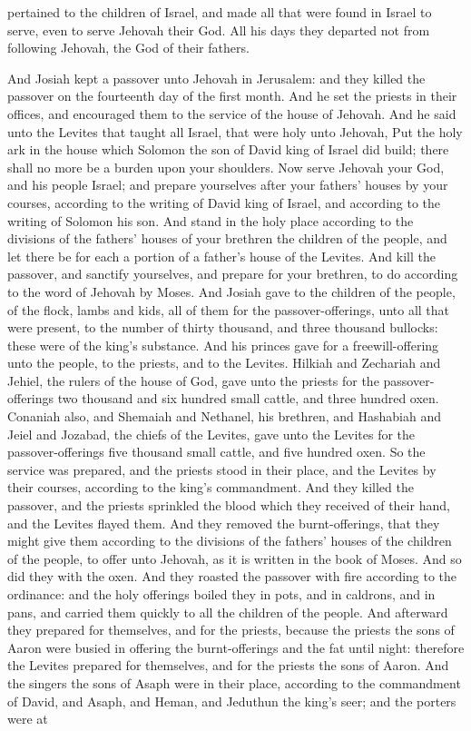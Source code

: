 pertained to the children of Israel, and made all that were found in Israel to serve, even to serve Jehovah their God. All his days they departed not from following Jehovah, the God of their fathers. 

And Josiah kept a passover unto Jehovah in Jerusalem: and they killed the passover on the fourteenth day of the first month. And he set the priests in their offices, and encouraged them to the service of the house of Jehovah. And he said unto the Levites that taught all Israel, that were holy unto Jehovah, Put the holy ark in the house which Solomon the son of David king of Israel did build; there shall no more be a burden upon your shoulders. Now serve Jehovah your God, and his people Israel; and prepare yourselves after your fathers’ houses by your courses, according to the writing of David king of Israel, and according to the writing of Solomon his son. And stand in the holy place according to the divisions of the fathers’ houses of your brethren the children of the people, and let there be for each a portion of a father’s house of the Levites. And kill the passover, and sanctify yourselves, and prepare for your brethren, to do according to the word of Jehovah by Moses.  And Josiah gave to the children of the people, of the flock, lambs and kids, all of them for the passover-offerings, unto all that were present, to the number of thirty thousand, and three thousand bullocks: these were of the king’s substance. And his princes gave for a freewill-offering unto the people, to the priests, and to the Levites. Hilkiah and Zechariah and Jehiel, the rulers of the house of God, gave unto the priests for the passover-offerings two thousand and six hundred small cattle, and three hundred oxen. Conaniah also, and Shemaiah and Nethanel, his brethren, and Hashabiah and Jeiel and Jozabad, the chiefs of the Levites, gave unto the Levites for the passover-offerings five thousand small cattle, and five hundred oxen.  So the service was prepared, and the priests stood in their place, and the Levites by their courses, according to the king’s commandment. And they killed the passover, and the priests sprinkled the blood which they received of their hand, and the Levites flayed them. And they removed the burnt-offerings, that they might give them according to the divisions of the fathers’ houses of the children of the people, to offer unto Jehovah, as it is written in the book of Moses. And so did they with the oxen. And they roasted the passover with fire according to the ordinance: and the holy offerings boiled they in pots, and in caldrons, and in pans, and carried them quickly to all the children of the people. And afterward they prepared for themselves, and for the priests, because the priests the sons of Aaron were busied in offering the burnt-offerings and the fat until night: therefore the Levites prepared for themselves, and for the priests the sons of Aaron. And the singers the sons of Asaph were in their place, according to the commandment of David, and Asaph, and Heman, and Jeduthun the king’s seer; and the porters were at 